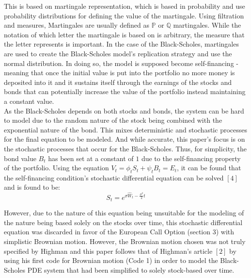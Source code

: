 \documentclass{report}
\begin{document}
	This is based on martingale representation, which is based in probability and use probability distributions for defining the value of the martingale. Using filtration and measures, Martingales are usually defined as $\mathbb{P}$ or $\mathbb{Q}$ martingales. While the notation of which letter the martingale is based on is arbitrary, the measure that the letter represents is important. In the case of the Black-Scholes, martingales are used to create the Black-Scholes model's replication strategy and use the normal distribution. In doing so, the model is supposed become self-financing - meaning that once the initial value is put into the portfolio no more money is deposited into it and it sustains itself through the earnings of the stocks and bonds that can potentially increase the value of the portfolio instead maintaining a constant value.\\
	
	As the Black-Scholes depends on both stocks and bonds, the system can be hard to model due to the random nature of the stock being combined with the exponential nature of the bond. This mixes deterministic and stochastic processes for the final equation to be modeled. And while accurate, this paper's focus is on the stochastic processes that occur for the Black-Scholes. Thus, for simplicity, the bond value $B_t$ has been set at a constant of $1$ due to the self-financing property of the portfolio. Using the equation $V_t = \phi_t S_t + \psi_t B_t = E_t$, it can be found that the self-financing condition's stochastic differential equation can be solved $[4]$ and is found to be:\\
	\[S_t = e^{\sigma\hat{W}_t - \frac{\sigma^2}{2}t}\]\vspace{0.05cm}
	
	However, due to the nature of this equation being unsuitable for the modeling of the nature being based solely on the stocks over time, this stochastic differential equation was discarded in favor of the European Call Option (section 3) with simplistic Brownian motion. However, the Brownian motion chosen was not truly specified by Highman and this paper follows that of Highman's article $[2]$ by using his first code for Brownian motion (Code 1) in order to model the Black-Scholes PDE system that had been simplified to solely stock-based over time.
	\\
	
\end{document}
